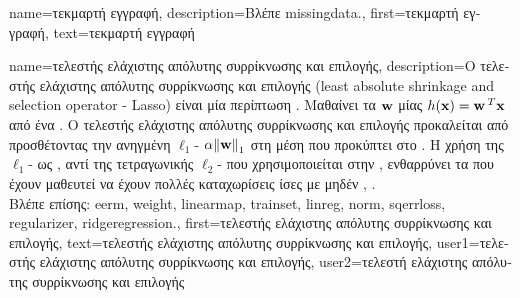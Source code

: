 {name={\foreignlanguage{greek}{τεκμαρτή εγγραφή}},
	description={\foreignlanguage{greek}{Βλέπε} \gls{missingdata}.},
	first={\foreignlanguage{greek}{τεκμαρτή εγγραφή}},
	text={\foreignlanguage{greek}{τεκμαρτή εγγραφή}}  
}%

{name={\foreignlanguage{greek}{τελεστής ελάχιστης απόλυτης συρρίκνωσης και επιλογής}}, 
	description={\foreignlanguage{greek}{Ο τελεστής ελάχιστης απόλυτης συρρίκνωσης και 
		επιλογής} 
		(least absolute shrinkage and selection operator - Lasso) \foreignlanguage{greek}{είναι μία περίπτωση} 
		\cite{hastie01statisticallearning}. \foreignlanguage{greek}{Μαθαίνει τα} 
		 ${\bf w}$ \foreignlanguage{greek}{μίας}  
		$h({\bf x}) = {\bf w}\,^{T} {\bf x}$ \foreignlanguage{greek}{από ένα} . 
		\foreignlanguage{greek}{Ο τελεστής ελάχιστης απόλυτης συρρίκνωσης και επιλογής προκαλείται από} 
		 \foreignlanguage{greek}{προσθέτοντας την ανηγμένη} $\ell_{1}$- 
		$\regparam \normgeneric{\weights}{1}$ \foreignlanguage{greek}{στη μέση}  
		\foreignlanguage{greek}{που προκύπτει στο}  \cite{Tibshirani1996}. \foreignlanguage{greek}{Η χρήση 
		της} $\ell_{1}$- \foreignlanguage{greek}{ως} , \foreignlanguage{greek}{αντί της
		τετραγωνικής} $\ell_{2}$- \foreignlanguage{greek}{που χρησιμοποιείται στην} , 
		\foreignlanguage{greek}{ενθαρρύνει τα}  \foreignlanguage{greek}{που έχουν μαθευτεί να έχουν πολλές 
		καταχωρίσεις ίσες με μηδέν} \cite{Wain2019}, \cite{BuhlGeerBook}.
		\\
		\foreignlanguage{greek}{Βλέπε επίσης:} \gls{eerm}, \gls{weight}, \gls{linearmap}, \gls{trainset}, \gls{linreg}, \gls{norm}, \gls{sqerrloss},
		\gls{regularizer}, \gls{ridgeregression}.},
	first={\foreignlanguage{greek}{τελεστής ελάχιστης απόλυτης συρρίκνωσης και επιλογής}},
	text={\foreignlanguage{greek}{τελεστής ελάχιστης απόλυτης συρρίκνωσης και επιλογής}},
	user1={\foreignlanguage{greek}{τελεστής ελάχιστης απόλυτης συρρίκνωσης και επιλογής}}, %
  	user2={\foreignlanguage{greek}{τελεστή ελάχιστης απόλυτης συρρίκνωσης και επιλογής}} %
}

